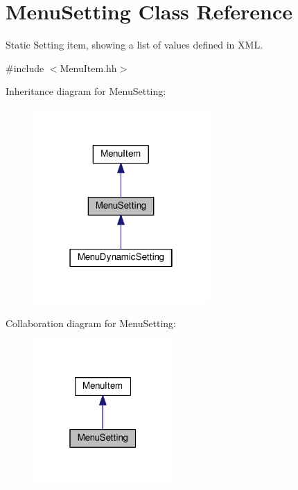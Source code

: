 \hypertarget{classMenuSetting}{}\section{Menu\+Setting Class Reference}
\label{classMenuSetting}


Static Setting item, showing a list of values defined in X\+ML.  




{\ttfamily \#include $<$Menu\+Item.\+hh$>$}



Inheritance diagram for Menu\+Setting\+:\nopagebreak
\begin{figure}[H]
\begin{center}
\leavevmode
\includegraphics[width=190pt]{classMenuSetting__inherit__graph}
\end{center}
\end{figure}


Collaboration diagram for Menu\+Setting\+:\nopagebreak
\begin{figure}[H]
\begin{center}
\leavevmode
\includegraphics[width=151pt]{classMenuSetting__coll__graph}
\end{center}
\end{figure}
